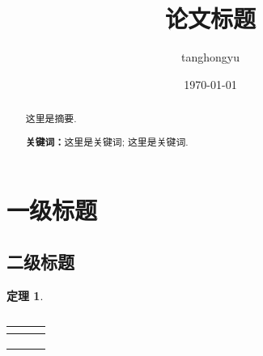 \documentclass[12pt, a4paper, oneside]{ctexart}
\title{\textbf{论文标题}}
\author{tanghongyu}
\date{\today}
\newtheorem{theorem}{定理}[section]
\begin{document}
\maketitle

\setcounter{page}{0}
\maketitle
\thispagestyle{empty}

\begin{abstract}
    这里是摘要.
    \par\textbf{关键词：}这里是关键词; 这里是关键词.
\end{abstract}

\newpage
{}
\setcounter{page}{1}
\tableofcontents
\newpage
\setcounter{page}{1}

\section{一级标题}

\subsection{二级标题}

\begin{theorem}

\end{theorem}

\begin{table}[htbp]
    \centering  %
    \caption{ }  %
    \label{tab2}  %
    \begin{adjustbox}{max width=\textwidth}
        \begin{tabular}{|c|c|c|}
            \hline
            $ $ &   & \\
            \hline
                &   & \\
            \hline
                &     \\
            \hline
                &   & \\
            \hline
        \end{tabular}
    \end{adjustbox}
\end{table}



\begin{equation}
    \begin{split}
    \end{split}
\end{equation}
\end{document}
